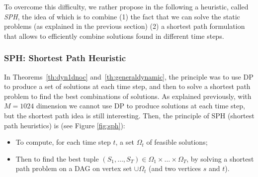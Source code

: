 \documentclass[a4paper]{book}
\begin{document}
To overcome this difficulty, we rather propose in the following a heuristic, called {\it SPH}, the idea of which is to combine (1) the fact that we can solve the static problems (as explained in the previous section) (2) a shortest path formulation that allows to efficiently combine  solutions found in different time steps.  


\subsubsection{SPH: Shortest Path Heuristic}





In Theorems~\ref{th:dyn1dnoc} and~\ref{th:generaldynamic}, the principle was to use DP to produce a set of solutions at each time step, and then to solve a shortest path problem to find the best combinations of solutions. As explained previously, with $M=1024$ dimension we cannot use DP to produce solutions at each time step, but the shortest path idea is still interesting. Then, the principle of SPH (shortest path heuristics) is (see Figure \ref{fig:sph}):
\begin{itemize}
    \item To compute, for each time step $t$, a set $\Omega_t$ of feasible solutions;
    \item Then to find the best tuple $(S_1,\dots,S_T)\in \Omega_1\times \dots \times \Omega_T$, by solving a shortest path problem on a DAG on vertex set $\cup \Omega_t$ (and two vertices $s$ and $t$).
\end{itemize}
\end{document}
